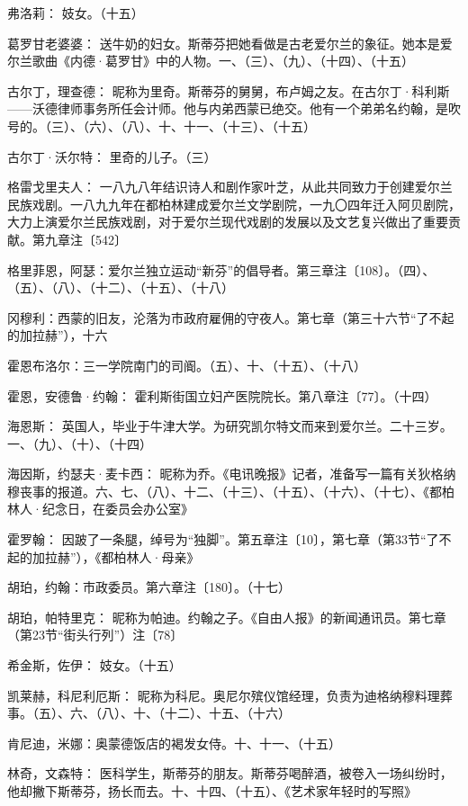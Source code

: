 \par 弗洛莉： 妓女。（十五）
\par 葛罗甘老婆婆： 送牛奶的妇女。斯蒂芬把她看做是古老爱尔兰的象征。她本是爱尔兰歌曲《内德·葛罗甘》中的人物。一、（三）、（九）、（十四）、（十五）
\par 古尔丁，理查德： 昵称为里奇。斯蒂芬的舅舅，布卢姆之友。在古尔丁·科利斯——沃德律师事务所任会计师。他与内弟西蒙已绝交。他有一个弟弟名约翰，是吹号的。（三）、（六）、（八）、十、十一、（十三）、（十五）
\par 古尔丁·沃尔特： 里奇的儿子。（三）
\par 格雷戈里夫人： 一八九八年结识诗人和剧作家叶芝，从此共同致力于创建爱尔兰民族戏剧。一八九九年在都柏林建成爱尔兰文学剧院，一九〇四年迁入阿贝剧院，大力上演爱尔兰民族戏剧，对于爱尔兰现代戏剧的发展以及文艺复兴做出了重要贡献。第九章注〔542〕
\par 格里菲恩，阿瑟：爱尔兰独立运动“新芬”的倡导者。第三章注〔108〕。（四）、（五）、（八）、（十二）、（十五）、（十八）
\par 冈穆利：西蒙的旧友，沦落为市政府雇佣的守夜人。第七章（第三十六节“了不起的加拉赫”），十六
\par 霍恩布洛尔：三一学院南门的司阍。（五）、十、（十五）、（十八）
\par 霍恩，安德鲁·约翰： 霍利斯街国立妇产医院院长。第八章注〔77〕。（十四）
\par 海恩斯： 英国人，毕业于牛津大学。为研究凯尔特文而来到爱尔兰。二十三岁。一、（九）、（十）、（十四）
\par 海因斯，约瑟夫·麦卡西： 昵称为乔。《电讯晚报》记者，准备写一篇有关狄格纳穆丧事的报道。六、七、（八）、十二、（十三）、（十五）、（十六）、（十七）、《都柏林人·纪念日，在委员会办公室》
\par 霍罗翰： 因跛了一条腿，绰号为“独脚”。第五章注〔10〕，第七章（第33节“了不起的加拉赫”），《都柏林人·母亲》
\par 胡珀，约翰：市政委员。第六章注〔180〕。（十七）
\par 胡珀，帕特里克： 昵称为帕迪。约翰之子。《自由人报》的新闻通讯员。第七章（第23节“街头行列”）注〔78〕
\par 希金斯，佐伊： 妓女。（十五）
\par 凯莱赫，科尼利厄斯： 昵称为科尼。奥尼尔殡仪馆经理，负责为迪格纳穆料理葬事。（五）、六、（八）、十、（十二）、十五、（十六）
\par 肯尼迪，米娜：奥蒙德饭店的褐发女侍。十、十一、（十五）
\par 林奇，文森特： 医科学生，斯蒂芬的朋友。斯蒂芬喝醉酒，被卷入一场纠纷时，他却撇下斯蒂芬，扬长而去。十、十四、（十五）、《艺术家年轻时的写照》
